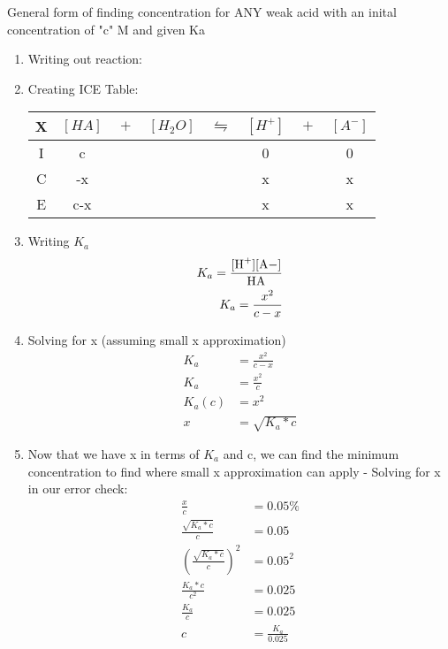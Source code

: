 \documentclass{article}  %
\begin{document}
General form of finding concentration for ANY weak acid with an inital concentration of "c" M and given Ka
\begin{enumerate}
    \item Writing out reaction:
    \item Creating ICE Table: 
    \newline
    \begin{tabular}{c|c@{}c@{}c@{}c@{}c@{}c@{}c}
        \hline
        X   & $[HA]$ & ${}+{}$ & $[H_2O]$ & ${}\leftrightharpoons{}$ & $[H^+]$ & ${}+{}$ & $[A^-]$ \\
        \hline
        I   &  c   &&     &&  0   && 0  \\
        C   &  -x    &&     &&  x   && x  \\
        E   &  c-x &&     &&  x   && x  \\      
    \end{tabular}
    \item Writing $K_a$
    \begin{equation*}
        \begin{aligned}
            K_a = \ce{\frac{[H+][A-]}{HA}} \\
            K_a = \frac{x^2}{c-x}
        \end{aligned}
    \end{equation*}
    \item Solving for x (assuming small x approximation)
    \begin{equation*}
        \begin{aligned}
            K_a &= \frac{x^2}{c-x} \\
            K_a &= \frac{x^2}{c} \\
            K_a(c) &= x^2 \\
            x &= \sqrt{K_a*c}
        \end{aligned}
    \end{equation*}
    \item Now that we have x in terms of $K_a$ and c, we can find the minimum concentration to find where small x approximation can apply - Solving for x in our error check:
    \begin{equation*}
        \begin{aligned}
            \frac{x}{c} &= 0.05\% \\
            \frac{\sqrt{K_a*c}}{c} &= 0.05 \\
            \left(\frac{\sqrt{K_a*c}}{c}\right) ^2&= 0.05^2 \\
            \frac{K_a*c}{c^2} &= 0.025 \\
            \frac{K_a}{c} &= 0.025 \\
            c &= \frac{K_a}{0.025}
        \end{aligned}
    \end{equation*}
\end{enumerate}
\end{document}
